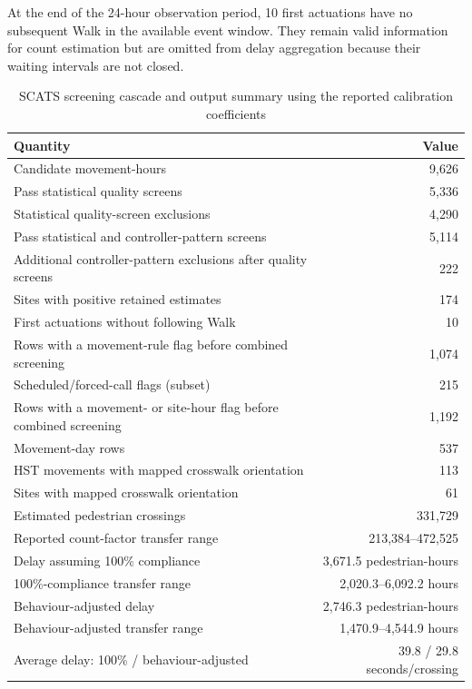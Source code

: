 \documentclass[11pt]{article}
\begin{document}
At the end of the 24-hour observation period, 10 first actuations have no subsequent Walk in the available event window. They remain valid information for count estimation but are omitted from delay aggregation because their waiting intervals are not closed.

\begin{table}[htbp]
\centering
\caption{SCATS screening cascade and output summary using the reported calibration coefficients}
\begin{tabular}{@{}p{}r@{}}
\toprule
Quantity & Value \\
\midrule
Candidate movement-hours & 9{,}626 \\
Pass statistical quality screens & 5{,}336 \\
Statistical quality-screen exclusions & 4{,}290 \\
Pass statistical and controller-pattern screens & 5{,}114 \\
Additional controller-pattern exclusions after quality screens & 222 \\
Sites with positive retained estimates & 174 \\
First actuations without following Walk & 10 \\
Rows with a movement-rule flag before combined screening & 1{,}074 \\
Scheduled/forced-call flags (subset) & 215 \\
Rows with a movement- or site-hour flag before combined screening & 1{,}192 \\
Movement-day rows & 537 \\
HST movements with mapped crosswalk orientation & 113 \\
Sites with mapped crosswalk orientation & 61 \\
Estimated pedestrian crossings & 331{,}729 \\
Reported count-factor transfer range & 213{,}384--472{,}525 \\
Delay assuming 100\% compliance & 3{,}671.5 pedestrian-hours \\
100\%-compliance transfer range & 2{,}020.3--6{,}092.2 hours \\
Behaviour-adjusted delay & 2{,}746.3 pedestrian-hours \\
Behaviour-adjusted transfer range & 1{,}470.9--4{,}544.9 hours \\
Average delay: 100\% / behaviour-adjusted & 39.8 / 29.8 seconds/crossing \\
\bottomrule
\end{tabular}
\end{table}
\end{document}
